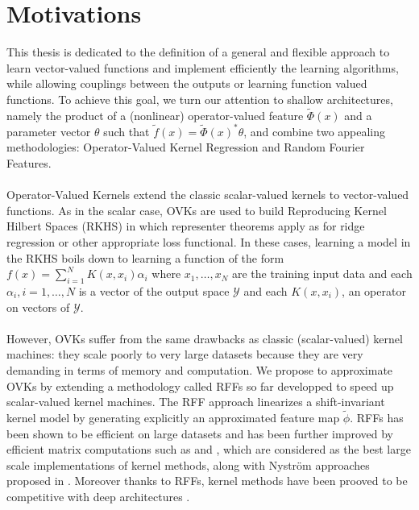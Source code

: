 \section{Motivations}
This thesis is dedicated to the definition of a general and flexible approach
to learn vector-valued functions and implement efficiently the learning
algorithms, while allowing couplings between the outputs or learning function
valued functions. To achieve this goal, we turn our attention to shallow
architectures, namely the product of a (nonlinear) operator-valued feature
$\tilde{\Phi}(x)$ and a parameter vector $\theta$ such that $\tilde{f}(x) =
\tilde{\Phi}(x)^* \theta$, and combine two appealing methodologies:
Operator-Valued Kernel Regression and Random Fourier Features.
\paragraph{}
Operator-Valued Kernels \citep{Micchelli2005,Carmeli2010,Alvarez2012} extend
the classic scalar-valued kernels to vector-valued functions. As in the scalar
case, \acfp{OVK} are used to build Reproducing Kernel
Hilbert Spaces (\acs{RKHS}) in which representer theorems apply as for ridge
regression or other appropriate loss functional. In these cases, learning a
model in the \acs{RKHS} boils down to learning a function of the form
$f(x)=\sum_{i=1}^N K(x,x_i)\alpha_i$ where $x_1, \ldots, x_N$ are the training
input data and each $\alpha_i, i=1, \ldots, N$ is a vector of the output space
$\mathcal{Y}$ and each $K(x,x_i)$, an operator on vectors of $\mathcal{Y}$.
\paragraph{}
However, \acsp{OVK} suffer from the same drawbacks as classic (scalar-valued)
kernel machines: they scale poorly to very large datasets because they are very
demanding in terms of memory and computation. We propose to approximate OVKs by
extending a methodology called \acfp{RFF} \citep{Rahimi2007, Le2013, Yang2015,
sriper2015, Bach2015, sutherland2015, rudi2016generalization} so far developped
to speed up scalar-valued kernel machines. The \acs{RFF} approach linearizes a
shift-invariant kernel model by generating explicitly an approximated feature
map $\tilde{\phi}$. \acsp{RFF} has been shown to be efficient on large datasets
and has been further improved by efficient matrix computations such as
\citep[``FastFood'']{Le2013} and \citep[``SORF'']{felix2016orthogonal}, which
are considered as the best large scale implementations of kernel methods, along
with Nystr\"om approaches proposed in \citet{drineas2005nystrom}. Moreover
thanks to \acsp{RFF}, kernel methods have been prooved to be competitive with
deep architectures \citep{lu2014scale, dai2014scalable, yang2015deep}.

